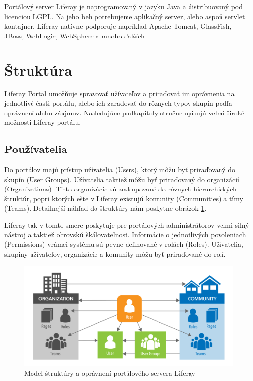 \documentclass[
  digital, %
  twoside, %
  notable,   %
  nolof,   %
  nolot,   %
]{fithesis3}
\begin{document}
Portálový server Liferay je naprogramovaný v jazyku Java a distribuovaný pod licenciou LGPL. Na jeho beh potrebujeme aplikačný server, alebo aspoň servlet kontajner. Liferay natívne podporuje napríklad Apache Tomcat, GlassFish, JBoss, WebLogic, WebSphere a mnoho ďalších.

\section{Štruktúra}
Liferay Portal umožňuje spravovať užívateľov a priraďovať im oprávnenia na jednotlivé časti portálu, alebo ich zaraďovať do rôznych typov skupín podľa oprávnení alebo záujmov. Nasledujúce podkapitoly stručne opisujú veľmi široké možnosti Liferay portálu.

\subsection{Používatelia}
\label{liferay_users}
Do portálov majú prístup užívatelia (Users), ktorý môžu byť priraďovaný do skupín (User Groups). Užívatelia taktiež môžu byť priraďovaný do organizácií (Organizations). Tieto organizácie sú zoskupované do rôznych hierarchických štruktúr, popri ktorých ešte v Liferay existujú komunity (Communities) a tímy (Teams). Detailnejší náhľad do štruktúry nám poskytne obrázok \ref{liferay_structure}.

Liferay tak v tomto smere poskytuje pre portálových administrátorov veľmi silný nástroj a taktiež obrovskú škálovateľnosť. Informácie o jednotlivých povoleniach (Permissions) vrámci systému sú pevne definované v rolách (Roles). Užívatelia, skupiny užívateľov, organizácie a komunity môžu byť priraďované do rolí\cite{sezov2010portal}.

\begin{figure}[H]
	\center
	\includegraphics[width=1.0\linewidth]{liferay_structure}
	\caption{Model štruktúry a oprávnení portálového servera Liferay\cite{sezov2010portal}}
	\label{liferay_structure}
\end{figure}
\end{document}
